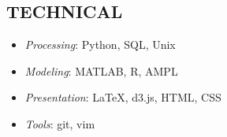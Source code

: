 \documentclass[margin]{res}
\begin{document}
\begin{resume}
%


\section{TECHNICAL}

\begin{minipage}[t]{0.5\textwidth}
\begin{itemize}
 \item 
    \textit{Processing}: Python, SQL, Unix
\item
\textit{Modeling}: MATLAB, R, AMPL
\end{itemize}
\end{minipage}
\begin{minipage}[t]{0.5\textwidth}
\begin{itemize}
\item
    \textit{Presentation}: \LaTeX, d3.js, HTML, CSS
\item
    \textit{Tools}: git, vim
\end{itemize}
\end{minipage}
\vspace{-2mm}



\end{resume}
\end{document}
